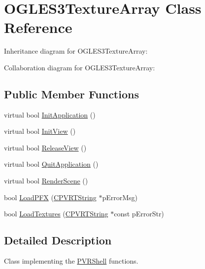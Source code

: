 \hypertarget{class_o_g_l_e_s3_texture_array}{\section{O\+G\+L\+E\+S3\+Texture\+Array Class Reference}
\label{class_o_g_l_e_s3_texture_array}
}


Inheritance diagram for O\+G\+L\+E\+S3\+Texture\+Array\+:


Collaboration diagram for O\+G\+L\+E\+S3\+Texture\+Array\+:
\subsection*{Public Member Functions}
\begin{DoxyCompactItemize}
\item 
virtual bool \hyperlink{class_o_g_l_e_s3_texture_array_af33c55d55479d9def91b5544443dfdc1}{Init\+Application} ()
\item 
virtual bool \hyperlink{class_o_g_l_e_s3_texture_array_aa9acba32facbe0fd94f059af2066a5cd}{Init\+View} ()
\item 
virtual bool \hyperlink{class_o_g_l_e_s3_texture_array_ac1fe26a6f22b15e2b9dd2a04d4b83f99}{Release\+View} ()
\item 
virtual bool \hyperlink{class_o_g_l_e_s3_texture_array_a1d3c9f5d3d873dbf4f78de5f3a8e0e5b}{Quit\+Application} ()
\item 
virtual bool \hyperlink{class_o_g_l_e_s3_texture_array_af24b8b15ed08d35ddce56853151627b8}{Render\+Scene} ()
\item 
bool \hyperlink{class_o_g_l_e_s3_texture_array_a73b9dbcabb0ed9d652b19c087b5bdf88}{Load\+P\+F\+X} (\hyperlink{class_c_p_v_r_t_string}{C\+P\+V\+R\+T\+String} $\ast$p\+Error\+Msg)
\item 
bool \hyperlink{class_o_g_l_e_s3_texture_array_a0875d4a558917bd316f61c362a9a0a8a}{Load\+Textures} (\hyperlink{class_c_p_v_r_t_string}{C\+P\+V\+R\+T\+String} $\ast$const p\+Error\+Str)
\end{DoxyCompactItemize}


\subsection{Detailed Description}


 Class implementing the \hyperlink{class_p_v_r_shell}{P\+V\+R\+Shell} functions. 

